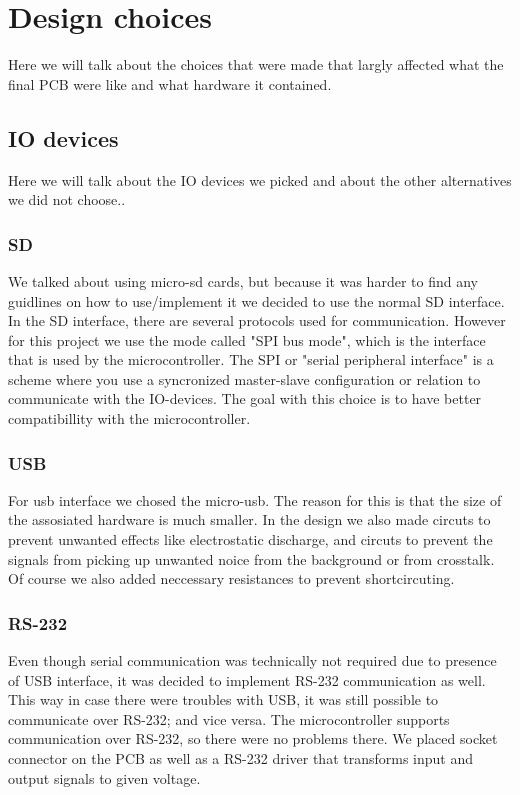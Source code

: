 \section {Design choices}

Here we will talk about the choices that were made that largly affected what the final PCB were like and what hardware it contained.

\subsection{IO devices} \label{pcb:design-choices:ss:IO_devices}
Here we will talk about the IO devices we picked and about the other alternatives we did not choose..

\subsubsection{SD}
We talked about using micro-sd cards, but because it was harder to find any guidlines on how to use/implement it we decided to use the normal SD interface.
In the SD interface, there are several protocols used for communication. 
However for this project we use the mode called "SPI bus mode", which is the interface that is used by the microcontroller.  
The SPI or "serial peripheral interface" is a scheme where you use a syncronized master-slave configuration or relation to communicate with the IO-devices. 
The goal with this choice is to have better compatibillity with the microcontroller.

\subsubsection{USB}
For usb interface we chosed the micro-usb. 
The reason for this is that the size of the assosiated hardware is much smaller.
In the design we also made circuts to prevent unwanted effects like electrostatic discharge, and circuts to prevent the signals from picking up unwanted noice from the background or from crosstalk.
Of course we also added neccessary resistances to prevent shortcircuting.


\subsubsection{RS-232}
Even though serial communication was technically not required due to presence of USB interface, it was decided to implement RS-232 communication as well.
This way in case there were troubles with USB, it was still possible to communicate over RS-232; and vice versa.
The microcontroller supports communication over RS-232, so there were no problems there.
We placed socket connector on the PCB as well as a RS-232 driver that transforms input and output signals to given voltage.

